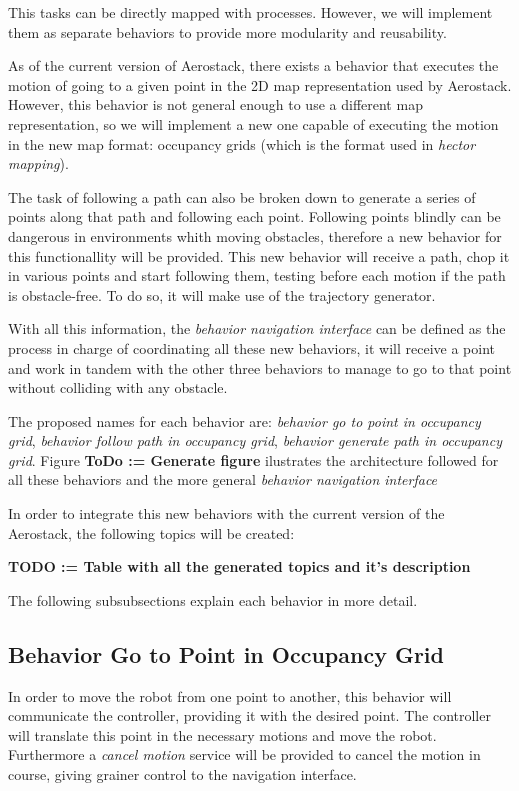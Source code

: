 This tasks can be directly mapped with processes. However, we will implement them as separate behaviors to provide more modularity and reusability. 

As of the current version of Aerostack, there exists a behavior that executes the motion of going to a given point in the 2D map representation used by Aerostack. However, this behavior is not general enough to use a different map representation, so we will implement a new one capable of executing the motion in the new map format: occupancy grids (which is the format used in \textit{hector mapping}).

The task of following a path can also be broken down to generate a series of points along that path and following each point. Following points blindly can be dangerous in environments whith moving obstacles, therefore a new behavior for this functionallity will be provided. This new behavior will receive a path, chop it in various points and start following them, testing before each motion if the path is obstacle-free. To do so, it will make use of the trajectory generator.

With all this information, the \textit{behavior navigation interface} can be defined as the process in charge of coordinating all these new behaviors, it will receive a point and work in tandem with the other three behaviors to manage to go to that point without colliding with any obstacle.

The proposed names for each behavior are: \textit{behavior go to point in occupancy grid}, \textit{behavior follow path in occupancy grid}, \textit{behavior generate path in occupancy grid}. Figure \textbf{ToDo := Generate figure} ilustrates the architecture followed for all these behaviors and the more general \textit{behavior navigation interface}


In order to integrate this new behaviors with the current version of the Aerostack, the following topics will be created:

\textbf{TODO := Table with all the generated topics and it's description}

The following subsubsections explain each behavior in more detail.

\subsection{Behavior Go to Point in Occupancy Grid}

In order to move the robot from one point to another, this behavior will communicate the controller, providing it with the desired point. The controller will translate this point in the necessary motions and move the robot. Furthermore a \textit{cancel motion} service will be provided to cancel the motion in course, giving grainer control to the navigation interface.

